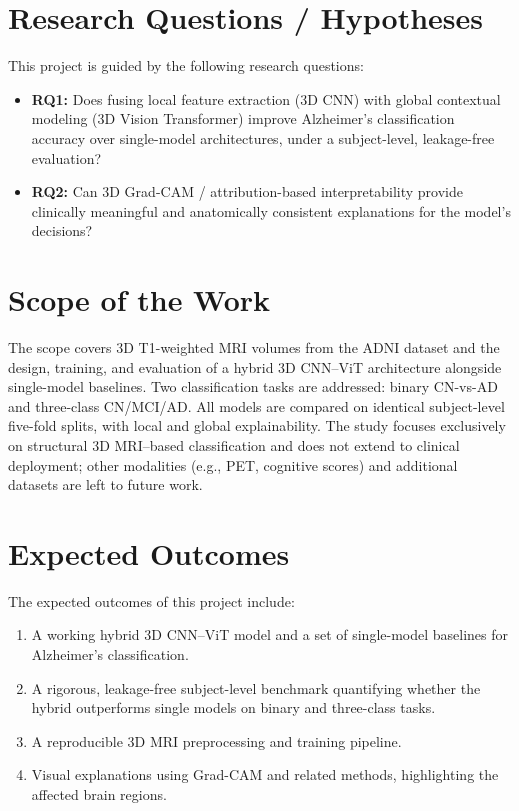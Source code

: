 \section{Research Questions / Hypotheses}
This project is guided by the following research questions:
\begin{itemize}
    \item \textbf{RQ1:} Does fusing local feature extraction (3D CNN) with global contextual modeling (3D Vision Transformer) improve Alzheimer's classification accuracy over single-model architectures, under a subject-level, leakage-free evaluation?
    \item \textbf{RQ2:} Can 3D Grad-CAM / attribution-based interpretability provide clinically meaningful and anatomically consistent explanations for the model's decisions?
\end{itemize}

\section{Scope of the Work}
The scope covers 3D T1-weighted MRI volumes from the ADNI dataset and the design, training, and evaluation of a hybrid 3D CNN–ViT architecture alongside single-model baselines. Two classification tasks are addressed: binary CN-vs-AD and three-class CN/MCI/AD. All models are compared on identical subject-level five-fold splits, with local and global explainability. The study focuses exclusively on structural 3D MRI–based classification and does not extend to clinical deployment; other modalities (e.g., PET, cognitive scores) and additional datasets are left to future work.

\section{Expected Outcomes}
The expected outcomes of this project include:
\begin{enumerate}
    \item A working hybrid 3D CNN–ViT model and a set of single-model baselines for Alzheimer's classification.
    \item A rigorous, leakage-free subject-level benchmark quantifying whether the hybrid outperforms single models on binary and three-class tasks.
    \item A reproducible 3D MRI preprocessing and training pipeline.
    \item Visual explanations using Grad-CAM and related methods, highlighting the affected brain regions.
\end{enumerate}


